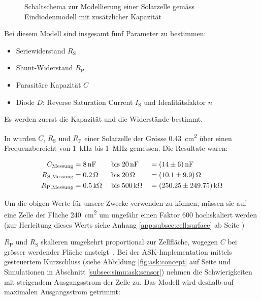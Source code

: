 \clearpage
\begin{figure}[h!tb]
    \centering
    
    \caption{%
        Schaltschema    zur    Modellierung    einer    Solarzelle    gem\"ass
        Eindiodenmodell mit zus\"atzlicher Kapazit\"at%
    }
    \label{fig:circuit:solarCell}
\end{figure}

Bei diesem Modell sind insgesamt f\"unf Parameter zu bestimmen:

\begin{itemize}
    \firmlist
    \item
        Seriewiderstand $R_{\mathrm{S}}$
    \item
        Shunt-Widerstand $R_{\mathrm{P}}$
    \item
        Parasit\"are Kapazit\"at $C$
    \item
        Diode   $D$: Reverse    Saturation   Current    $I_{\mathrm{S}}$   und
        Idealit\"atsfaktor $n$
\end{itemize}

Es werden zuerst die Kapazit\"at und die Widerst\"ande bestimmt.

In \cite{ref:solar:scofield} wurden $C$, $R_{\mathrm{S}}$ und $R_{\mathrm{P}}$
einer  Solarzelle der  Gr\"osse  \SI{0.43}{\centi\meter\squared} \"uber  einen
Frequenzbereicht von \SI{1}{\kilo\hertz} bis \SI{1}{\mega\hertz} gemessen. Die
Resultate waren:

\begin{alignat}{3}
    \label{eq:scofield:C}
    C_{\mathrm{Messung}}    &= \SI{8}{\nano\farad} \; & \text{bis} \; & \SI{20}{\nano\farad} \;  & = & \; \SI{14 \pm 6}{\nano\farad} \\
    \label{eq:scofield:Rs}
    R_{\mathrm{S, Messung}} &= \SI{0.2}{\ohm}      \; & \text{bis} \; & \SI{20}{\ohm}        \;  & = & \; \SI{10.1 \pm 9.9}{\ohm}     \\
    \label{eq:scofield:Rp}
    R_{\mathrm{P, Messung}} &= \SI{0.5}{\kilo\ohm} \; & \text{bis} \; & \SI{500}{\kilo\ohm}  \;  & = & \; \SI{250.25 \pm 249.75}{\kilo\ohm}
\end{alignat}

Um die  obigen Werte f\"ur unsere  Zwecke verwenden zu k\"onnen,  m\"ussen sie
auf eine Zelle der Fl\"ache \SI{240}{\centi\meter\squared} um ungef\"ahr einen
Faktor \num{600} hochskaliert werden (zur Herleitung dieses Werts siehe Anhang
\ref{app:subsec:cell:surface} ab Seite \pageref{app:subsec:cell:surface})

$R_{\mathrm{P}}$   und  $R_{\mathrm{S}}$   skalieren  umgekehrt   proportional
zur   Zellfl\"ache,    wogegen   $C$   bei   gr\"osser    werdender   Fl\"ache
ansteigt~\cite{ref:solar:scofield}. Bei    der   ASK-Implementation    mittels
gesteuertem   Kurzschluss    (siehe   Abbildung    \ref{fig:ask:concept}   auf
Seite    \pageref{fig:ask:concept}     und    Simulationen     in    Abschnitt
\ref{subsec:simu:ask:sensor})  nehmen   die  Schwierigkeiten   mit  steigendem
Ausgangsstrom   der  Zelle   zu. Das   Modell  wird   deshalb  auf   maximalen
Ausgangsstrom getrimmt:

